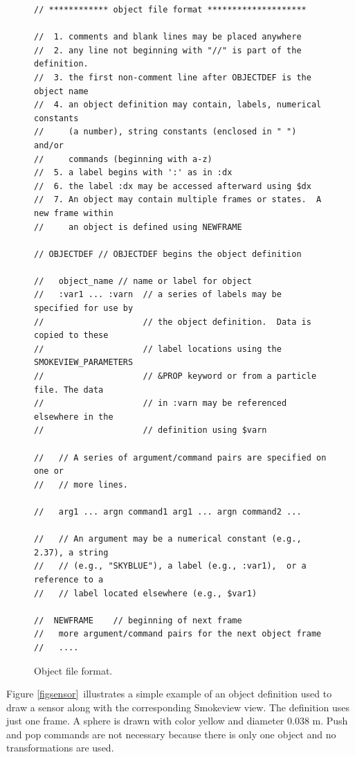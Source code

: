 \documentclass[11pt,twoside]{book}
\begin{document}
\begin{figure}[bph]
{\small
\begin{lstlisting}[frame=single,rulecolor=\color{yellow},
framerule=1pt,framesep=1pc,fillcolor=\color{yellow}]
// ************ object file format ********************

//  1. comments and blank lines may be placed anywhere
//  2. any line not beginning with "//" is part of the definition.
//  3. the first non-comment line after OBJECTDEF is the object name
//  4. an object definition may contain, labels, numerical constants
//     (a number), string constants (enclosed in " ") and/or
//     commands (beginning with a-z)
//  5. a label begins with ':' as in :dx
//  6. the label :dx may be accessed afterward using $dx
//  7. An object may contain multiple frames or states.  A new frame within
//     an object is defined using NEWFRAME

// OBJECTDEF // OBJECTDEF begins the object definition

//   object_name // name or label for object
//   :var1 ... :varn  // a series of labels may be specified for use by
//                    // the object definition.  Data is copied to these
//                    // label locations using the SMOKEVIEW_PARAMETERS
//                    // &PROP keyword or from a particle file. The data
//                    // in :varn may be referenced  elsewhere in the
//                    // definition using $varn

//   // A series of argument/command pairs are specified on one or
//   // more lines.

//   arg1 ... argn command1 arg1 ... argn command2 ...

//   // An argument may be a numerical constant (e.g., 2.37), a string
//   // (e.g., "SKYBLUE"), a label (e.g., :var1),  or a reference to a
//   // label located elsewhere (e.g., $var1)

//  NEWFRAME    // beginning of next frame
//   more argument/command pairs for the next object frame
//   ....
\end{lstlisting}
}
\caption{Object file format.}
\label{figobjectdef}%
\end{figure}

Figure \ref{figsensor}\ illustrates a simple example of an object definition
used to draw a sensor along with the corresponding Smokeview view.
The definition uses just one frame. A sphere is drawn with color
yellow and diameter 0.038 m. Push and pop commands are not necessary
because there is only one object and no transformations are used.
\end{document}
